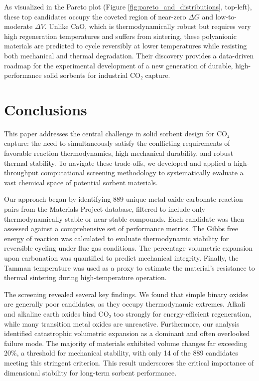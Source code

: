 \documentclass[]{article}
\begin{document}
As visualized in the Pareto plot (Figure \ref{fig:pareto_and_distributions}, top-left), these top candidates occupy the coveted region of near-zero $\Delta G$ and low-to-moderate $\Delta V$. Unlike CaO, which is thermodynamically robust but requires very high regeneration temperatures and suffers from sintering, these polyanionic materials are predicted to cycle reversibly at lower temperatures while resisting both mechanical and thermal degradation. Their discovery provides a data-driven roadmap for the experimental development of a new generation of durable, high-performance solid sorbents for industrial CO₂ capture.

\section{Conclusions}
\label{sec:conclusions}
This paper addresses the central challenge in solid sorbent design for CO₂ capture: the need to simultaneously satisfy the conflicting requirements of favorable reaction thermodynamics, high mechanical durability, and robust thermal stability. To navigate these trade-offs, we developed and applied a high-throughput computational screening methodology to systematically evaluate a vast chemical space of potential sorbent materials.

Our approach began by identifying 889 unique metal oxide-carbonate reaction pairs from the Materials Project database, filtered to include only thermodynamically stable or near-stable compounds. Each candidate was then assessed against a comprehensive set of performance metrics. The Gibbs free energy of reaction was calculated to evaluate thermodynamic viability for reversible cycling under flue gas conditions. The percentage volumetric expansion upon carbonation was quantified to predict mechanical integrity. Finally, the Tamman temperature was used as a proxy to estimate the material's resistance to thermal sintering during high-temperature operation.

The screening revealed several key findings. We found that simple binary oxides are generally poor candidates, as they occupy thermodynamic extremes. Alkali and alkaline earth oxides bind CO₂ too strongly for energy-efficient regeneration, while many transition metal oxides are unreactive. Furthermore, our analysis identified catastrophic volumetric expansion as a dominant and often overlooked failure mode. The majority of materials exhibited volume changes far exceeding 20\%, a threshold for mechanical stability, with only 14 of the 889 candidates meeting this stringent criterion. This result underscores the critical importance of dimensional stability for long-term sorbent performance.
\end{document}
